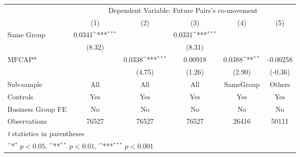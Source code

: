 {
\def\sym#1{\ifmmode^{#1}\else\(^{#1}\)\fi}
\begin{tabular}{l*{5}{c}}
\hline\hline
                &\multicolumn{5}{c}{Dependent Variable:  Future Pairs's co-movement}                           \\\cmidrule(lr){2-6}
                &\multicolumn{1}{c}{(1)}         &\multicolumn{1}{c}{(2)}         &\multicolumn{1}{c}{(3)}         &\multicolumn{1}{c}{(4)}         &\multicolumn{1}{c}{(5)}         \\
\hline
Same Group      &   0.0341\sym{***}&                  &   0.0331\sym{***}&                  &                  \\
                &   (8.32)         &                  &   (8.31)         &                  &                  \\
[1em]
$ \text{MFCAP*} $&                  &   0.0338\sym{***}&  0.00918         &   0.0388\sym{**} & -0.00258         \\
                &                  &   (4.75)         &   (1.26)         &   (2.90)         &  (-0.36)         \\
\hline
Sub-sample      &      All         &      All         &      All         &SameGroup         &   Others         \\
Controls        &      Yes         &      Yes         &      Yes         &      Yes         &      Yes         \\
Business Group FE&       No         &       No         &       No         &       No         &       No         \\
Observations    &    76527         &    76527         &    76527         &    26416         &    50111         \\
\hline\hline
\multicolumn{6}{l}{\footnotesize \textit{t} statistics in parentheses}\\
\multicolumn{6}{l}{\footnotesize \sym{*} \(p<0.05\), \sym{**} \(p<0.01\), \sym{***} \(p<0.001\)}\\
\end{tabular}
}
